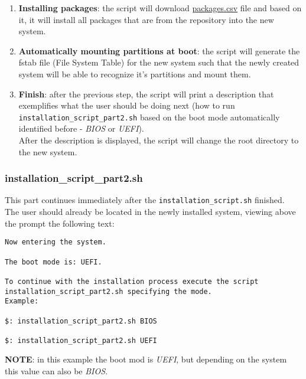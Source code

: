 \documentclass{article}
\begin{document}
\begin{enumerate}
\begin{itemize}
	\end{itemize}
	\item \textbf{Installing packages}: the script will download \href{https://github.com/arghpy/individual_project/blob/main/packages.csv}{packages.csv} file and based on it, it will install all packages that are from the repository into the new system.
	\item \textbf{Automatically mounting partitions at boot}: the script will generate the fstab file (File System Table) for the new system such that the newly created system will be able to recognize it's partitions and mount them.
	\item \textbf{Finish}: after the previous step, the script will print a description that exemplifies what the user should be doing next (how to run\\ \texttt{installation\_script\_part2.sh} based on the boot mode automatically identified before - \textit{BIOS} or \textit{UEFI}).\\
	After the description is displayed, the script will change the root directory to the new system.
	
\end{enumerate}

\subsubsection{installation\_script\_part2.sh}

This part continues immediately after the \texttt{installation\_script.sh} finished.\\
The user should already be located in the newly installed system, viewing above the prompt the following text:
\begin{verbatim}
Now entering the system.

The boot mode is: UEFI.

To continue with the installation process execute the script
installation_script_part2.sh specifying the mode.
Example:

$: installation_script_part2.sh BIOS

$: installation_script_part2.sh UEFI

\end{verbatim}

\noindent \textbf{NOTE}: in this example the boot mod is \textit{UEFI}, but depending on the system this value can
also be \textit{BIOS}.
\newline
\end{document}
